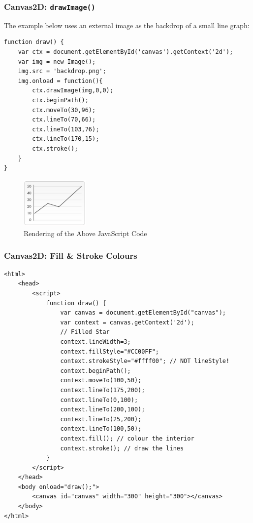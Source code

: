 \documentclass[a4paper,11pt]{article}
\begin{document}
\subsubsection{Canvas2D: \texttt{drawImage()}}
The example below uses an external image as the backdrop of a small line graph:
\begin{verbatim}
function draw() {
    var ctx = document.getElementById('canvas').getContext('2d');
    var img = new Image();
    img.src = 'backdrop.png';
    img.onload = function(){
        ctx.drawImage(img,0,0);
        ctx.beginPath();
        ctx.moveTo(30,96);
        ctx.lineTo(70,66);
        ctx.lineTo(103,76);
        ctx.lineTo(170,15);
        ctx.stroke();
    }
}
\end{verbatim}

\begin{figure}[H]
    \centering
    \includegraphics[width=0.3\textwidth]{images/canvas2d_drawimage.png}
    \caption{Rendering of the Above JavaScript Code}
\end{figure}

\subsubsection{Canvas2D: Fill \& Stroke Colours}
\begin{verbatim}
<html>
    <head>
        <script>
            function draw() {
                var canvas = document.getElementById("canvas");
                var context = canvas.getContext('2d');
                // Filled Star
                context.lineWidth=3;
                context.fillStyle="#CC00FF";
                context.strokeStyle="#ffff00"; // NOT lineStyle!
                context.beginPath();
                context.moveTo(100,50);
                context.lineTo(175,200);
                context.lineTo(0,100);
                context.lineTo(200,100);
                context.lineTo(25,200);
                context.lineTo(100,50);
                context.fill(); // colour the interior
                context.stroke(); // draw the lines
            }
        </script>
    </head>
    <body onload="draw();">
        <canvas id="canvas" width="300" height="300"></canvas>
    </body>
</html>
\end{verbatim}
\end{document}
